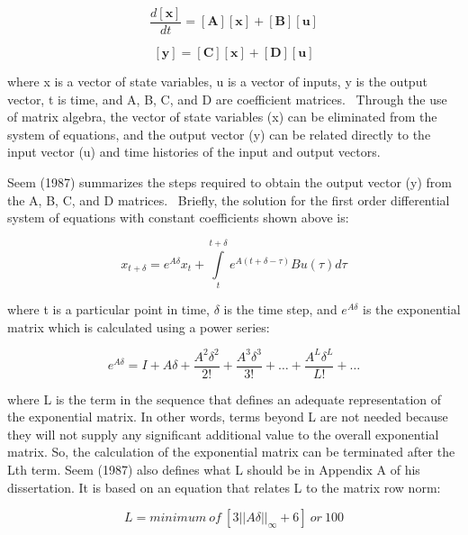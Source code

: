 \begin{equation}
\frac{{d\left[ {\mathbf{x}} \right]}}{{dt}} = \left[ {\mathbf{A}} \right]\left[ {\mathbf{x}} \right] + \left[ {\mathbf{B}} \right]\left[ {\mathbf{u}} \right]
\end{equation}

\begin{equation}
\left[ {\mathbf{y}} \right] = \left[ {\mathbf{C}} \right]\left[ {\mathbf{x}} \right] + \left[ {\mathbf{D}} \right]\left[ {\mathbf{u}} \right]
\end{equation}

where x is a vector of state variables, u is a vector of inputs, y is the output vector, t is time, and A, B, C, and D are coefficient matrices.~ Through the use of matrix algebra, the vector of state variables (x) can be eliminated from the system of equations, and the output vector (y) can be related directly to the input vector (u) and time histories of the input and output vectors.

Seem (1987) summarizes the steps required to obtain the output vector (y) from the A, B, C, and D matrices.~ Briefly, the solution for the first order differential system of equations with constant coefficients shown above is:

\begin{equation}
x_{t + \delta} = e^{A \delta} x_t + \int\limits_t^{t + \delta } {e^{A (t + \delta - \tau)} B u(\tau) d \tau}
\end{equation}

where t is a particular point in time, \(\delta\) is the time step, and \(e^{A \delta}\) is the exponential matrix which is calculated using a power series:

\begin{equation}
e^{A \delta} = I + A \delta + \frac{A^2 \delta ^ 2}{2!} + \frac{A^3 \delta ^ 3}{3!} + \ldots{} + \frac{A^L \delta ^ L}{L!} + \ldots{}
\end{equation}

where L is the term in the sequence that defines an adequate representation of the exponential matrix.  In other words, terms beyond L are not needed because they will not supply any significant additional value to the overall exponential matrix.  So, the calculation of the exponential matrix can be terminated after the Lth term.  Seem (1987) also defines what L should be in Appendix A of his dissertation.  It is based on an equation that relates L to the matrix row norm:

\begin{equation}
L = minimum~of~[3 ||A \delta||_\infty + 6]~or~100
\end{equation}

